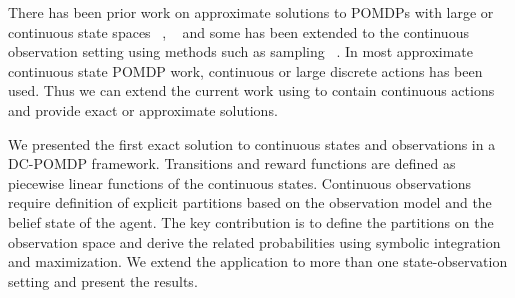 \documentclass{article} %
\begin{document}
There has been prior work on approximate solutions to POMDPs with large or continuous state spaces ~\cite{Thrun99h}, ~\cite{Perseus} and some has been extended to the continuous observation setting using methods such as sampling ~\cite{Perseus_cont}.
In most approximate continuous state POMDP work, continuous or large discrete actions has been used. Thus we can extend the current work using \cite{zamani_aaai12} to contain continuous actions and provide exact or approximate solutions. 

We presented the first exact solution to continuous states and observations in a DC-POMDP framework. Transitions and reward functions are defined as piecewise linear functions of the continuous states. Continuous observations require definition of explicit partitions based on the observation model and the belief state of the agent. The key contribution is to define the partitions on the observation space and derive the related probabilities using symbolic integration and maximization. We extend the application to more than one state-observation setting and present the results.  
 


\end{document}
